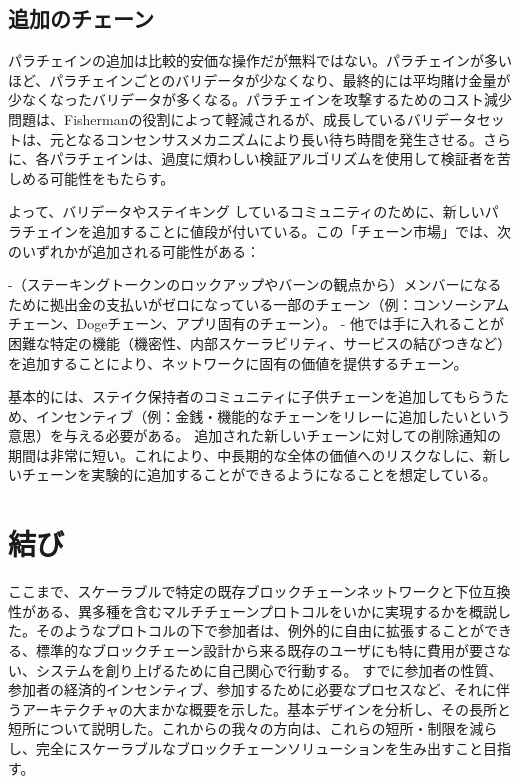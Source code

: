 \hypertarget{ux8ffdux52a0ux306eux30c1ux30a7ux30fcux30f3}{%
\subsection{追加のチェーン}\label{ux8ffdux52a0ux306eux30c1ux30a7ux30fcux30f3}}

パラチェインの追加は比較的安価な操作だが無料ではない。パラチェインが多いほど、パラチェインごとのバリデータが少なくなり、最終的には平均賭け金量が少なくなったバリデータが多くなる。パラチェインを攻撃するためのコスト減少問題は、Fishermanの役割によって軽減されるが、成長しているバリデータセットは、元となるコンセンサスメカニズムにより長い待ち時間を発生させる。さらに、各パラチェインは、過度に煩わしい検証アルゴリズムを使用して検証者を苦しめる可能性をもたらす。

よって、バリデータやステイキング
しているコミュニティのために、新しいパラチェインを追加することに値段が付いている。この「チェーン市場」では、次のいずれかが追加される可能性がある：

-（ステーキングトークンのロックアップやバーンの観点から）メンバーになるために拠出金の支払いがゼロになっている一部のチェーン（例：コンソーシアムチェーン、Dogeチェーン、アプリ固有のチェーン）。
-
他では手に入れることが困難な特定の機能（機密性、内部スケーラビリティ、サービスの結びつきなど）を追加することにより、ネットワークに固有の価値を提供するチェーン。

基本的には、ステイク保持者のコミュニティに子供チェーンを追加してもらうため、インセンティブ（例：金銭・機能的なチェーンをリレーに追加したいという意思）を与える必要がある。
追加された新しいチェーンに対しての削除通知の期間は非常に短い。これにより、中長期的な全体の価値へのリスクなしに、新しいチェーンを実験的に追加することができるようになることを想定している。

\hypertarget{ux7d50ux3073}{%
\section{結び}\label{ux7d50ux3073}}

ここまで、スケーラブルで特定の既存ブロックチェーンネットワークと下位互換性がある、異多種を含むマルチチェーンプロトコルをいかに実現するかを概説した。そのようなプロトコルの下で参加者は、例外的に自由に拡張することができる、標準的なブロックチェーン設計から来る既存のユーザにも特に費用が要さない、システムを創り上げるために自己関心で行動する。
すでに参加者の性質、参加者の経済的インセンティブ、参加するために必要なプロセスなど、それに伴うアーキテクチャの大まかな概要を示した。基本デザインを分析し、その長所と短所について説明した。これからの我々の方向は、これらの短所・制限を減らし、完全にスケーラブルなブロックチェーンソリューションを生み出すこと目指す。

